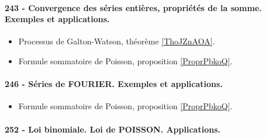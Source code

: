 \paragraph{243 - Convergence des séries entières, propriétés de la somme. Exemples et applications.}
\begin{itemize}
    \item Processus de Galton-Watson, théorème \ref{ThoJZnAOA}.
    \item Formule sommatoire de Poisson, proposition \ref{ProprPbkoQ}.
\end{itemize}
\paragraph{246 - Séries de FOURIER. Exemples et applications.}
\begin{itemize}
    \item Formule sommatoire de Poisson, proposition \ref{ProprPbkoQ}.
\end{itemize}
\paragraph{252 - Loi binomiale. Loi de POISSON. Applications.}


